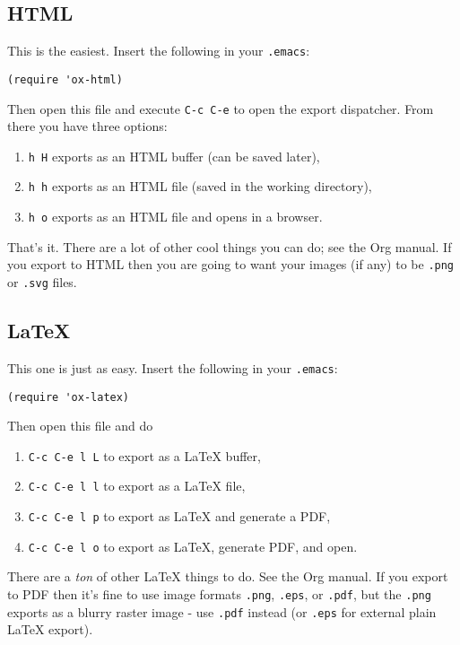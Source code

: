 \documentclass[11pt]{article}
\begin{document}
\subsection[HTML]{HTML}
\label{sec-4-1}
This is the easiest. Insert the following in your \texttt{.emacs}:

\begin{verbatim}
(require 'ox-html)
\end{verbatim}

Then open this file and execute \texttt{C-c C-e} to open the export
dispatcher.  From there you have three options:

\begin{enumerate}
\item \texttt{h H} exports as an HTML buffer (can be saved later),
\item \texttt{h h} exports as an HTML file (saved in the working directory),
\item \texttt{h o} exports as an HTML file and opens in a browser.
\end{enumerate}

That's it.  There are a lot of other cool things you can do; see the
Org manual.  If you export to HTML then you are going to want your
images (if any) to be \texttt{.png} or \texttt{.svg} files.
\subsection[\LaTeX{}]{\LaTeX{}}
\label{sec-4-2}

This one is just as easy.  Insert the following in your \texttt{.emacs}:

\begin{verbatim}
(require 'ox-latex)
\end{verbatim}

Then open this file and do

\begin{enumerate}
\item \texttt{C-c C-e l L} to export as a \LaTeX{} buffer,
\item \texttt{C-c C-e l l} to export as a \LaTeX{} file,
\item \texttt{C-c C-e l p} to export as \LaTeX{} and generate a PDF,
\item \texttt{C-c C-e l o} to export as \LaTeX{}, generate PDF, and open.
\end{enumerate}

There are a \emph{ton} of other \LaTeX{} things to do.  See the Org manual.
If you export to PDF then it's fine to use image formats \texttt{.png},
\texttt{.eps}, or \texttt{.pdf}, but the \texttt{.png} exports as a blurry raster image -
use \texttt{.pdf} instead (or \texttt{.eps} for external plain \LaTeX{} export).
\end{document}

